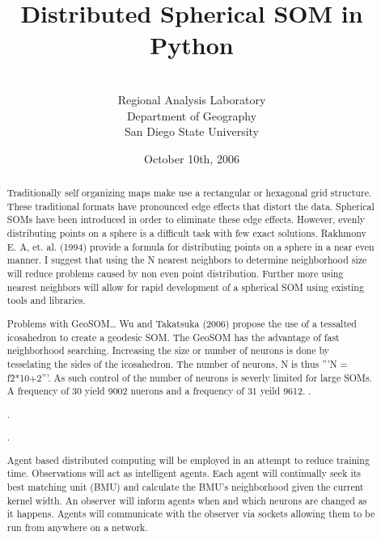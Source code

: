 \documentclass[11pt]{article}
\begin{document}
\title{Distributed Spherical SOM in Python}
\author{\\Regional Analysis Laboratory\\Department of Geography\\San Diego State University}

\date{October 10th, 2006}
\maketitle
\begin{abstract}
Traditionally self organizing maps make use a rectangular or hexagonal grid structure.  These traditional formats have pronounced edge effects that distort the data.  Spherical SOMs have been introduced in order to eliminate these edge effects.  However, evenly distributing points on a sphere is a difficult task with few exact solutions.  Rakhmonv E. A, et. al. (1994) provide a formula for distributing points on a sphere in a near even manner.  I suggest that using the N nearest neighbors to determine neighborhood size will reduce problems caused by non even point distribution.  Further more using nearest neighbors will allow for rapid development of a spherical SOM using existing tools and libraries.

Problems with GeoSOM\ldots
Wu and Takatsuka (2006) propose the use of a tessalted icosahedron to create a
geodesic SOM.  The GeoSOM has the advantage of fast neighborhood searching.
Increasing the size or number of neurons is done by tesselating the sides of
the icosahedron.  The number of neurons, N is thus '''N = f\^2*10+2'''.  As such control of the number of neurons is severly limited for large SOMs. A frequency of 30 yield 9002 nuerons and a frequency of 31 yeild 9612.
.

.

.

Agent based distributed computing will be employed in an attempt to reduce training time.  Observations will act as intelligent agents. Each agent will continually seek its best matching unit (BMU) and calculate the BMU's neighborhood given the current kernel width.  An observer will inform agents when and which neurons are changed as it happens.  Agents will communicate with the observer via sockets allowing them to be run from anywhere on a network.
\end{abstract}
\end{document}
